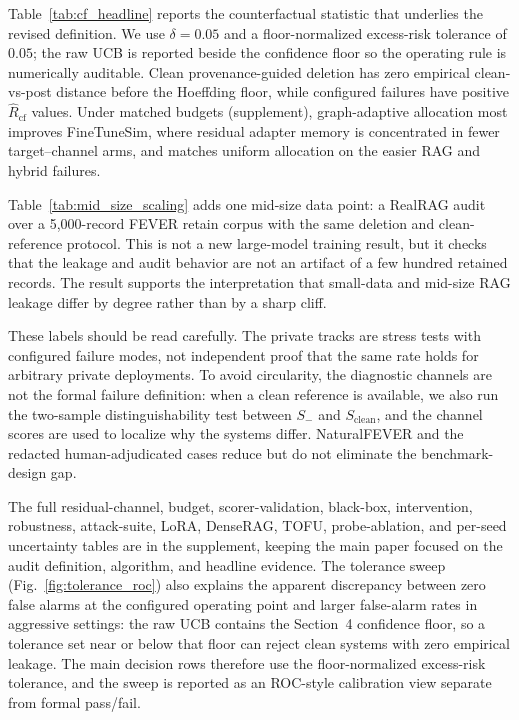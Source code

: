 

Table~\ref{tab:cf_headline} reports the counterfactual statistic that underlies the revised definition. We use $\delta=0.05$ and a floor-normalized excess-risk tolerance of $0.05$; the raw UCB is reported beside the confidence floor so the operating rule is numerically auditable. Clean provenance-guided deletion has zero empirical clean-vs-post distance before the Hoeffding floor, while configured failures have positive $\hat R_{\mathrm{cf}}$ values. Under matched budgets (supplement), graph-adaptive allocation most improves FineTuneSim, where residual adapter memory is concentrated in fewer target--channel arms, and matches uniform allocation on the easier RAG and hybrid failures.



Table~\ref{tab:mid_size_scaling} adds one mid-size data point: a RealRAG audit over a 5,000-record FEVER retain corpus with the same deletion and clean-reference protocol. This is not a new large-model training result, but it checks that the leakage and audit behavior are not an artifact of a few hundred retained records. The result supports the interpretation that small-data and mid-size RAG leakage differ by degree rather than by a sharp cliff.

These labels should be read carefully. The private tracks are stress tests with configured failure modes, not independent proof that the same rate holds for arbitrary private deployments. To avoid circularity, the diagnostic channels are not the formal failure definition: when a clean reference is available, we also run the two-sample distinguishability test between $S_-$ and $S_{\mathrm{clean}}$, and the channel scores are used to localize why the systems differ. NaturalFEVER and the redacted human-adjudicated cases reduce but do not eliminate the benchmark-design gap.

The full residual-channel, budget, scorer-validation, black-box, intervention, robustness, attack-suite, LoRA, DenseRAG, TOFU, probe-ablation, and per-seed uncertainty tables are in the supplement, keeping the main paper focused on the audit definition, algorithm, and headline evidence. The tolerance sweep (Fig.~\ref{fig:tolerance_roc}) also explains the apparent discrepancy between zero false alarms at the configured operating point and larger false-alarm rates in aggressive settings: the raw UCB contains the Section~4 confidence floor, so a tolerance set near or below that floor can reject clean systems with zero empirical leakage. The main decision rows therefore use the floor-normalized excess-risk tolerance, and the sweep is reported as an ROC-style calibration view separate from formal pass/fail.


